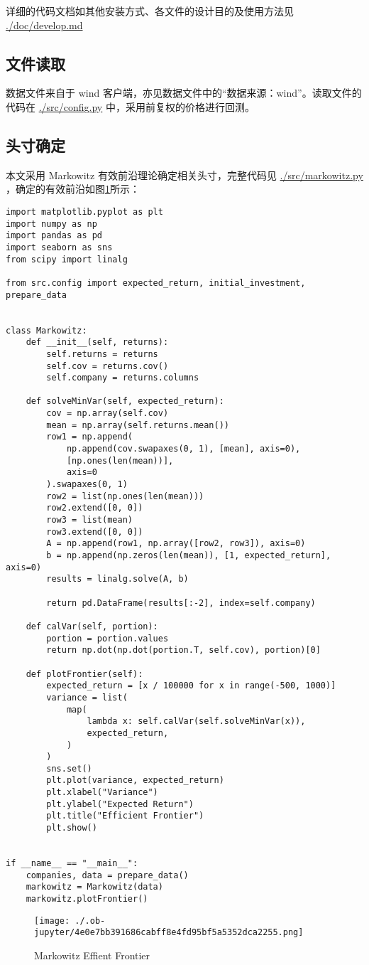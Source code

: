 \documentclass[a4paper,12pt]{ctexart}
\begin{document}
详细的代码文档如其他安装方式、各文件的设计目的及使用方法见 \url{./doc/develop.md}

\subsection{文件读取}
\label{sec:orga8dd2f2}
数据文件来自于 wind 客户端，亦见数据文件中的“数据来源：wind”。读取文件的代码在 \url{./src/config.py} 中，采用前复权的价格进行回测。

\subsection{头寸确定}
\label{sec:org86bbe05}
本文采用 Markowitz 有效前沿理论确定相关头寸，完整代码见 \url{./src/markowitz.py} ，确定的有效前沿如图\ref{fig:orgff223c7}所示：
\small\begin{verbatim}
import matplotlib.pyplot as plt
import numpy as np
import pandas as pd
import seaborn as sns
from scipy import linalg

from src.config import expected_return, initial_investment, prepare_data


class Markowitz:
    def __init__(self, returns):
        self.returns = returns
        self.cov = returns.cov()
        self.company = returns.columns

    def solveMinVar(self, expected_return):
        cov = np.array(self.cov)
        mean = np.array(self.returns.mean())
        row1 = np.append(
            np.append(cov.swapaxes(0, 1), [mean], axis=0),
            [np.ones(len(mean))],
            axis=0
        ).swapaxes(0, 1)
        row2 = list(np.ones(len(mean)))
        row2.extend([0, 0])
        row3 = list(mean)
        row3.extend([0, 0])
        A = np.append(row1, np.array([row2, row3]), axis=0)
        b = np.append(np.zeros(len(mean)), [1, expected_return], axis=0)
        results = linalg.solve(A, b)

        return pd.DataFrame(results[:-2], index=self.company)

    def calVar(self, portion):
        portion = portion.values
        return np.dot(np.dot(portion.T, self.cov), portion)[0]

    def plotFrontier(self):
        expected_return = [x / 100000 for x in range(-500, 1000)]
        variance = list(
            map(
                lambda x: self.calVar(self.solveMinVar(x)),
                expected_return,
            )
        )
        sns.set()
        plt.plot(variance, expected_return)
        plt.xlabel("Variance")
        plt.ylabel("Expected Return")
        plt.title("Efficient Frontier")
        plt.show()


if __name__ == "__main__":
    companies, data = prepare_data()
    markowitz = Markowitz(data)
    markowitz.plotFrontier()

\end{verbatim}
\begin{figure}[htbp]
\centering
\texttt{[image: ./.ob-jupyter/4e0e7bb391686cabff8e4fd95bf5a5352dca2255.png]}
\caption{\label{fig:orgff223c7}Markowitz Effient Frontier}
\end{figure}
\end{document}
